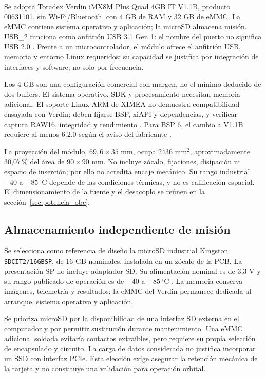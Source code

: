 \documentclass[11pt,letterpaper]{article}
\begin{document}
Se adopta Toradex Verdin iMX8M Plus Quad 4GB IT V1.1B, producto 00631101, sin Wi-Fi/Bluetooth, con 4 GB de RAM y 32 GB de eMMC. La eMMC contiene sistema operativo y aplicación; la microSD almacena misión. USB\_2 funciona como anfitrión USB 3.1 Gen 1: el nombre del puerto no significa USB 2.0 \cite{verdinds,verdinpcn}. Frente a un microcontrolador, el módulo ofrece el anfitrión USB, memoria y entorno Linux requeridos; su capacidad se justifica por integración de interfaces y software, no solo por frecuencia.

Los 4 GB son una configuración comercial con margen, no el mínimo deducido de dos buffers. El sistema operativo, SDK y procesamiento necesitan memoria adicional. El soporte Linux ARM de XIMEA no demuestra compatibilidad ensayada con Verdin; deben fijarse BSP, xiAPI y dependencias, y verificar captura RAW16, integridad y rendimiento \cite{ximealinux}. Para BSP 6, el cambio a V1.1B requiere al menos 6.2.0 según el aviso del fabricante \cite{verdinpcn}.

La proyección del módulo, $69,6\times35$ mm, ocupa 2436 mm$^2$, aproximadamente 30,07\,\% del área de $90\times90$ mm. No incluye zócalo, fijaciones, disipación ni espacio de inserción; por ello no acredita encaje mecánico. Su rango industrial $-40$ a $+85\,^\circ$C depende de las condiciones térmicas, y no es calificación espacial. El dimensionamiento de la fuente y el desacoplo se reúnen en la sección~\ref{sec:potencia_obc}.

\subsection{Almacenamiento independiente de misión}

Se selecciona como referencia de diseño la microSD industrial Kingston
\texttt{SDCIT2/16GBSP}, de 16 GB nominales, instalada en un zócalo de la
PCB. La presentación SP no incluye adaptador SD. Su alimentación
nominal es de 3,3 V y su rango publicado de operación es de
$-40$ a $+85\,^{\circ}\mathrm{C}$ \cite{kingstonsdcit2}.
La memoria conserva imágenes, telemetría y resultados; la eMMC del
Verdin permanece dedicada al arranque, sistema operativo y aplicación.

Se prioriza microSD por la disponibilidad de una interfaz SD externa
en el computador y por permitir sustitución durante mantenimiento.
Una eMMC adicional soldada evitaría contactos extraíbles, pero requiere
su propia selección de encapsulado y circuito. La carga de datos
considerada no justifica incorporar un SSD con interfaz PCIe.
Esta elección exige asegurar la retención mecánica de la tarjeta y
no constituye una validación para operación orbital.
\end{document}
